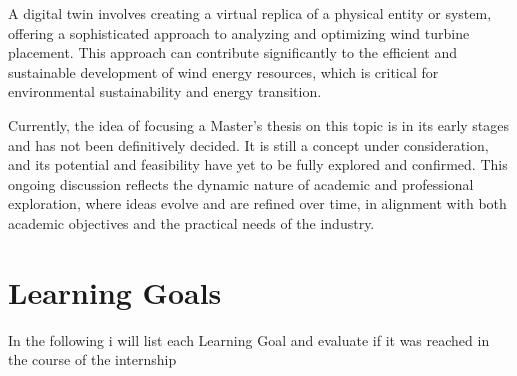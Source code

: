 \documentclass[11pt, titlepage, a4paper]{article}
\begin{document}
A digital twin involves creating a virtual replica of a physical entity or system, offering a sophisticated approach to analyzing and optimizing wind turbine placement. This approach can contribute significantly to the efficient and sustainable development of wind energy resources, which is critical for environmental sustainability and energy transition.

Currently, the idea of focusing a Master's thesis on this topic is in its early stages and has not been definitively decided. It is still a concept under consideration, and its potential and feasibility have yet to be fully explored and confirmed. This ongoing discussion reflects the dynamic nature of academic and professional exploration, where ideas evolve and are refined over time, in alignment with both academic objectives and the practical needs of the industry.

\section{Learning Goals}
In the following i will list each Learning Goal and evaluate if it was reached in the course of the internship
\end{document}
